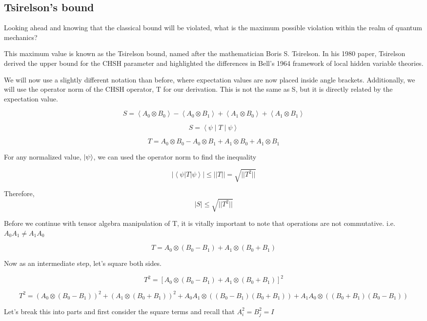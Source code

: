 \documentclass[12pt]{article}
\begin{document}
\subsection{Tsirelson’s bound}

Looking ahead and knowing that the classical bound will be violated, what is the maximum possible violation within the realm of quantum mechanics?

This maximum value is known as the Tsirelson bound, named after the mathematician Boris S. Tsirelson. In his 1980 paper, Tsirelson derived the upper bound for the CHSH parameter and highlighted the differences in Bell's 1964 framework of local hidden variable theories. \cite{Tsirelson_Paper} \cite{Bell1964}

We will now use a slightly different notation than before, where expectation values are now placed inside angle brackets. Additionally, we will use the operator norm of the CHSH operator, T for our derivation. This is not the same as S, but it is directly related by the expectation value. 

$$
S =
\left\langle A_0 \otimes B_0 \right\rangle - \left\langle A_0 \otimes B_1 \right\rangle + \left\langle A_1 \otimes B_0 \right\rangle +\left\langle A_1 \otimes B_1 \right\rangle
$$

$$
S = \left\langle \psi \middle| T \middle| \psi \right\rangle
$$

$$
T = A_0 \otimes B_0 - A_0 \otimes B_1 + A_1 \otimes B_0 + A_1 \otimes B_1
$$

For any normalized value, $\ket{\psi}$, we can used the operator norm to find the inequality

\[
|\left\langle \psi \big| T \big| \psi \right\rangle| \leq ||T|| = \sqrt{||T^2||}
\]

Therefore, 
\[
|S| \leq  \sqrt{||T^2||}
\]

Before we continue with tensor algebra manipulation of T, it is vitally important to note that operations are not commutative. i.e. $A_0 A_1 \neq A_1 A_0$

$$
T = A_0 \otimes(B_0 - B_1) + A_1 \otimes(B_0 + B_1)
$$

Now as an intermediate step, let's square both sides.

$$
T^2 = [A_0 \otimes(B_0 - B_1) + A_1 \otimes(B_0 + B_1)]^2
$$

$$
T^2 = (A_0 \otimes(B_0 - B_1))^2 + (A_1 \otimes(B_0 + B_1))^2 + A_0A_1 \otimes ((B_0 - B_1)(B_0 + B_1)) + A_1 A_0 \otimes ((B_0 + B_1) ( B_0 - B_1))
$$

Let's break this into parts and first consider the square terms and 
recall that $A_i^2 = B_j^2 = I$
\end{document}

